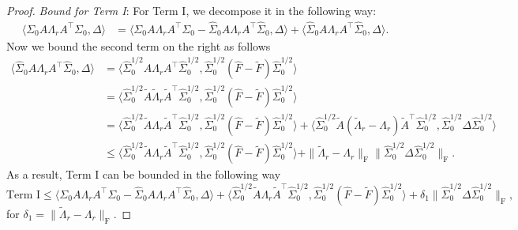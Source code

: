 \documentclass[11pt]{article}
\newcommand{\so}{\widehat{\Sigma}_0}
\newcommand{\0}{{\mathbf{0}}}
\newcommand{\tA}{{\widetilde{A}}}
\newcommand{\tF}{{\widetilde{F}}}
\newcommand{\tlambda}{{\widetilde{\Lambda}_r}}
\begin{document}
\begin{proof}
\textit{Bound for Term I}: For Term I, we decompose it in the following way: \begin{align*}
\langle \Sigma_0A\Lambda_rA^\top\Sigma_0,\Delta\rangle&= \langle \Sigma_0A\Lambda_rA^\top\Sigma_0-\so A\Lambda_r A^\top\so,\Delta\rangle+\langle \so A\Lambda_r A^\top\so,\Delta\rangle. 
\end{align*}
Now we bound the second term on the right as follows\begin{align*}
\langle \so A\Lambda_r A^\top\so,\Delta\rangle &= \langle \so^{1/2}A\Lambda_r A^\top\so^{1/2},\so^{1/2}(\widehat{F}-\tF)\so^{1/2} \rangle\\
&=  \langle \so^{1/2}\tA\tlambda \tA^\top\so^{1/2},\so^{1/2}(\widehat{F}-\tF)\so^{1/2} \rangle\\
&= \langle \so^{1/2}\tA\Lambda_r \tA^\top\so^{1/2},\so^{1/2}(\widehat{F}-\tF)\so^{1/2} \rangle+\langle \so^{1/2}\tA(\tlambda-\Lambda_r)\tA^\top\so^{1/2}, \so^{1/2}\Delta\so^{1/2} \rangle \\
&\leq \langle \so^{1/2}\tA\Lambda_r \tA^\top\so^{1/2},\so^{1/2}(\widehat{F}-\tF)\so^{1/2} \rangle+\|\tlambda-\Lambda_r\|_\mathrm{F}\|\so^{1/2}\Delta\so^{1/2} \|_\mathrm{F}.
\end{align*}
As a result, Term I can be bounded in the following way\begin{equation*}
\text{Term I}\leq \langle \Sigma_0A\Lambda_rA^\top\Sigma_0-\so A\Lambda_r A^\top\so,\Delta\rangle+\langle \so^{1/2}\tA\Lambda_r \tA^\top\so^{1/2},\so^{1/2}(\widehat{F}-\tF)\so^{1/2} \rangle+\delta_1\|\so^{1/2}\Delta\so^{1/2} \|_\mathrm{F},
\end{equation*}
for $\delta_1 = \|\tlambda-\Lambda_r\|_\mathrm{F}$.

\smallskip


\end{proof}
\end{document}
